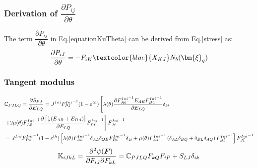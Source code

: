 \documentclass[oneside,11pt,times]{book}
\begin{document}
\subsubsection{Derivation of $\dfrac{\partial P_{ij}}{ \partial{\theta}}$}

The term $\dfrac{\partial P_{ij}}{ \partial{\theta}}$ in Eq.\eqref{equationKuTheta} can be derived from Eq.\eqref{stress} as:
\begin{equation}
\begin{aligned}
\centering
\dfrac{\partial P_{iJ}}{ \partial{\theta}}=-F_{iK}\textcolor{blue}{X_{KJ}}N_b(\bm{\xi}_q)
\end{aligned}
\end{equation}

\subsubsection*{Tangent modulus}
\begin{equation}
\begin{aligned}
\centering
&\mathbb{C}_{PJLQ}=\frac{\partial S_{PJ}}{\partial E_{LQ}}=J^{Ini}{{F}^{Ini}_{P\tilde{s}}}^{-1}(1-\varepsilon^{th})\left[\lambda(\theta)\frac{\partial {{F}^{Ini}_{A\tilde{u}}}^{-1}{E}_{AB}{{F}^{Ini}_{B\tilde{u}}}^{-1}}{\partial E_{LQ}}\delta_{\tilde{s}\tilde{t}}\right.\\&\left.+2\mu (\theta){{F}^{Ini}_{A\tilde{s}}}^{-1}\frac{\partial\left[\frac{1}{2}(E_{AB}+E_{BA})\right]}{\partial E_{LQ}}{{F}^{Ini}_{B\tilde{t}}}^{-1}\right]{{F}^{Ini}_{J\tilde{t}}}^{-1}\\&=
 J^{Ini}{{F}^{Ini}_{P\tilde{s}}}^{-1}(1-\varepsilon^{th})\left[\lambda(\theta){{F}^{Ini}_{A\tilde{u}}}^{-1}\delta_{AL}\delta_{QB}{{F}^{Ini}_{B\tilde{u}}}^{-1}\delta_{\tilde{s}\tilde{t}}+\mu (\theta) {{F}^{Ini}_{A\tilde{s}}}^{-1} \left(\delta_{AL}\delta_{BQ}+\delta_{BL}\delta_{AQ}\right){{F}^{Ini}_{B\tilde{t}}}^{-1}
 \right]{{F}^{Ini}_{J\tilde{t}}}^{-1}
\end{aligned}
\label{tangentModulus}
\end{equation}
\begin{equation}
\begin{aligned}
\centering
 \mathbb{K}_{iJkL}=\frac{\partial^2\psi(\boldsymbol{F})}{\partial F_{iJ} \partial F_{kL}}=\mathbb{C}_{PJLQ}F_{kQ}F_{iP}+S_{LJ}\delta_{ik}
\end{aligned}
\label{tangentModulus}
\end{equation}
\end{document}

